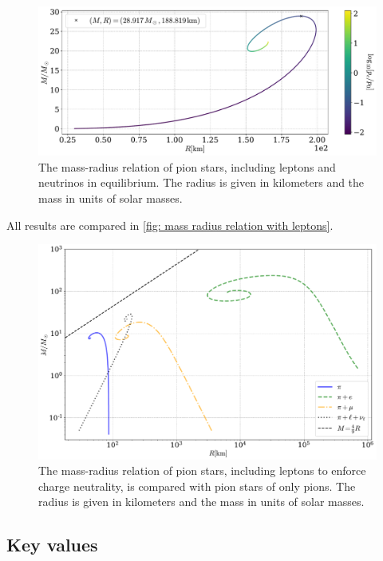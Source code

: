 \begin{figure}[!htb]
    \centering
    \includegraphics[width=\textwidth]{../scripts/figurer/pion_star/mass_radius_neutrino.pdf}
    \caption{
        The mass-radius relation of pion stars, including leptons and neutrinos in equilibrium.
        The radius is given in kilometers and the mass in units of solar masses.
        }
        \label{fig: mass radius neutrino}
\end{figure}

All results are compared in \autoref{fig: mass radius relation with leptons}.

\begin{figure}[!htb]
    \centering
    \includegraphics[width=\textwidth]{../scripts/figurer/pion_star/mass_radius_all.pdf}
    \caption{
        The mass-radius relation of pion stars, including leptons to enforce charge neutrality, is compared with pion stars of only pions.
        The radius is given in kilometers and the mass in units of solar masses.
        }
        \label{fig: mass radius relation with leptons}
\end{figure}


\subsection{Key values}


